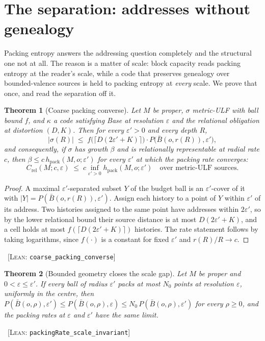 \documentclass[11pt,reqno]{amsart}
\theoremstyle{plain}
\newtheorem{theorem}{Theorem}[section]
\theoremstyle{definition}
\newcommand{\hpack}{h_{\mathrm{pack}}}
\newcommand{\Crel}{C_{\mathrm{rel}}}
\newcommand{\eps}{\varepsilon}
\newcommand{\cert}[1]{{\footnotesize\ [\textsc{Lean}: \texttt{#1}]}}
\begin{document}
\section{The separation: addresses without genealogy}\label{sec:balloon}

Packing entropy answers the addressing question completely and the structural one not at all. The reason is a matter of scale: block capacity reads packing entropy at the reader's scale, while a code that preserves genealogy over bounded-valence sources is held to packing entropy at \emph{every} scale. We prove that once, and read the separation off it.

\begin{theorem}[Coarse packing converse]\label{thm:coarse}
Let $M$ be proper, $\sigma$ metric-ULF with ball bound $f$, and $\kappa$ a code satisfying Base at resolution $\eps$ and the relational obligation at distortion $(D,K)$. Then for every $\eps'>0$ and every depth $R$,
\[
|\sigma(R)|\;\le\;f\bigl(\lceil D(2\eps'+K)\rceil\bigr)\cdot P\bigl(\bar B(o,r(R)),\eps'\bigr),
\]
and consequently, if $\sigma$ has growth $\beta$ and is relationally representable at radial rate $c$, then $\beta\le c\,\hpack(M,o;\eps')$ for every $\eps'$ at which the packing rate converges:
\[
\Crel(M;c,\eps)\;\le\;c\inf_{\eps'>0}\hpack(M,o;\eps')\quad\text{over metric-ULF sources.}
\]
\end{theorem}

\begin{proof}
A maximal $\eps'$-separated subset $Y$ of the budget ball is an $\eps'$-cover of it with $|Y|=P(\bar B(o,r(R)),\eps')$. Assign each history to a point of $Y$ within $\eps'$ of its address. Two histories assigned to the same point have addresses within $2\eps'$, so by the lower relational bound their source distance is at most $D(2\eps'+K)$, and a cell holds at most $f(\lceil D(2\eps'+K)\rceil)$ histories. The rate statement follows by taking logarithms, since $f(\cdot)$ is a constant for fixed $\eps'$ and $r(R)/R\to c$.
\end{proof}\cert{coarse\_packing\_converse}


\begin{theorem}[Bounded geometry closes the scale gap]\label{thm:scaleinv}
Let $M$ be proper and $0<\eps\le\eps'$. If every ball of radius $\eps'$ packs at most $N_0$ points at resolution $\eps$, uniformly in the centre, then $P(\bar B(o,\rho),\eps')\le P(\bar B(o,\rho),\eps)\le N_0\,P(\bar B(o,\rho),\eps')$ for every $\rho\ge0$, and the packing rates at $\eps$ and $\eps'$ have the same limit.
\end{theorem}\cert{packingRate\_scale\_invariant}
\end{document}
